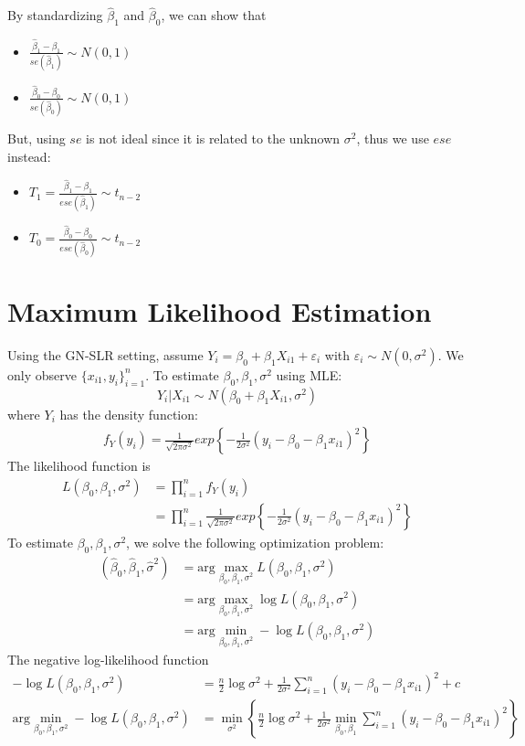 \documentclass{article}
\newcommand{\argmin}{\text{arg}\min}
\newcommand{\sumiton}{\sum_{i=1}^n}
\newcommand{\betahat}{\hat{\beta}}
\begin{document}
\noindent By standardizing $\betahat_1$ and $\betahat_0$, we can show that
\begin{itemize}
    \item $\frac{\betahat_1 - \beta_1}{se(\betahat_1)} \sim N(0,1)$
    \item $\frac{\betahat_0 - \beta_0}{se(\betahat_0)} \sim N(0,1)$
\end{itemize}
But, using $se$ is not ideal since it is related to the unknown $\sigma^2$, thus we use $ese$ instead:
\begin{itemize}
    \item $T_1 = \frac{\betahat_1 - \beta_1}{ese(\betahat_1)} \sim t_{n-2}$
    \item $T_0 = \frac{\betahat_0 - \beta_0}{ese(\betahat_0)} \sim t_{n-2}$
\end{itemize}
\section{Maximum Likelihood Estimation}
Using the GN-SLR setting, assume $Y_i = \beta_0 + \beta_1X_{i1} + \varepsilon_i$ with $\varepsilon_i \sim N(0,\sigma^2)$. We only observe $\{x_{i1}, y_i\}_{i=1}^{n}$. To estimate $\beta_0,\beta_1,\sigma^2$ using MLE:
\[Y_i|X_{i1} \sim N(\beta_0+\beta_1X_{i1},\sigma^2)\]
where $Y_i$ has the density function:
\begin{align}
    f_Y(y_i) = \frac{1}{\sqrt{2\pi\sigma^2}}exp\left\{-\frac{1}{2\sigma^2}(y_i - \beta_0-\beta_1x_{i1})^2\right\}
\end{align}
The likelihood function is
\begin{align}
    L(\beta_0,\beta_1,\sigma^2) &= \prod_{i=1}^n f_Y(y_i)\\
    &= \prod_{i=1}^n \frac{1}{\sqrt{2\pi\sigma^2}}exp\left\{-\frac{1}{2\sigma^2}(y_i - \beta_0-\beta_1x_{i1})^2\right\}
\end{align}
To estimate $\beta_0,\beta_1,\sigma^2$, we solve the following optimization problem:
\begin{align}
    (\betahat_0,\betahat_1, \hat{\sigma}^2) &= \text{arg}\max_{\beta_0,\beta_1,\sigma^2} L(\beta_0,\beta_1,\sigma^2)\\
    &= \text{arg}\max_{\beta_0,\beta_1,\sigma^2} \log L(\beta_0,\beta_1,\sigma^2)\\
    &= \text{arg}\min_{\beta_0,\beta_1,\sigma^2} -\log L(\beta_0,\beta_1,\sigma^2)
\end{align}
The negative log-likelihood function
\begin{align}
    -\log L(\beta_0,\beta_1,\sigma^2)&= \frac{n}{2}\log\sigma^2 + \frac{1}{2\sigma^2}\sumiton(y_i - \beta_0-\beta_1x_{i1})^2 + c\\
    \argmin_{\beta_0,\beta_1,\sigma^2} -\log L(\beta_0,\beta_1,\sigma^2) &= \min_{\sigma^2} \left\{\frac{n}{2}\log\sigma^2 + \frac{1}{2\sigma^2}\min_{\beta_0,\beta_1}\sumiton(y_i - \beta_0-\beta_1x_{i1})^2\right\}
\end{align}
\end{document}
